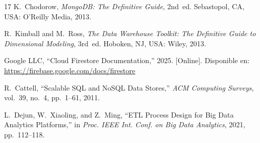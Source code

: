 \documentclass[journal]{IEEEtran}
\begin{document}
\begin{thebibliography}{17}
		K.~Chodorow,
		\emph{MongoDB: The Definitive Guide}, 2nd~ed.
		Sebastopol, CA, USA: O'Reilly Media, 2013.
		
		R.~Kimball and M.~Ross,
		\emph{The Data Warehouse Toolkit: The Definitive Guide to
			Dimensional Modeling}, 3rd~ed.
		Hoboken, NJ, USA: Wiley, 2013.
		
		Google LLC,
		``Cloud Firestore Documentation,'' 2025.
		[Online]. Disponible en: \url{https://firebase.google.com/docs/firestore}
		
		R.~Cattell,
		``Scalable SQL and NoSQL Data Stores,''
		\emph{ACM Computing Surveys}, vol.~39, no.~4, pp.~1--61, 2011.
		
		L.~Dejun, W.~Xiaoling, and Z.~Ming,
		``ETL Process Design for Big Data Analytics Platforms,''
		in \emph{Proc. IEEE Int. Conf. on Big Data Analytics}, 2021,
		pp.~112--118.
		
	\end{thebibliography}
	
\end{document}
